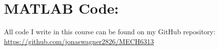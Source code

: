 \documentclass[letter]{article}
\begin{document}
\newpage
\appendix
\section{MATLAB Code:}
All code I write in this course can be found on my GitHub repository:\\
\href{https://github.com/jonaswagner2826/MECH6313}{https://github.com/jonaswagner2826/MECH6313}

\end{document}
